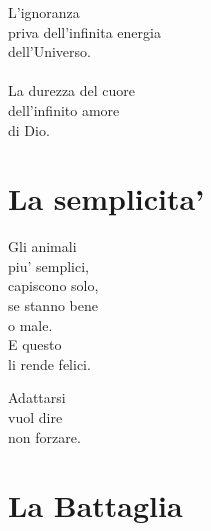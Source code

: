 \begin{haiku}
    L'ignoranza\\
    priva dell'infinita energia\\
    dell'Universo.\\
    \leavevmode\\
    La durezza del cuore\\
    dell'infinito amore\\
    di Dio.\\
\end{haiku}


\section{La semplicita'}
\begin{haiku}
    Gli animali\\
    piu' semplici,\\
    capiscono solo,\\
    se stanno bene \\
    o male.\\
    E questo\\
    li rende felici.\\
\end{haiku}

\begin{haiku}
Adattarsi \\
vuol dire\\
non forzare.\\
\end{haiku}


\section{La Battaglia}



